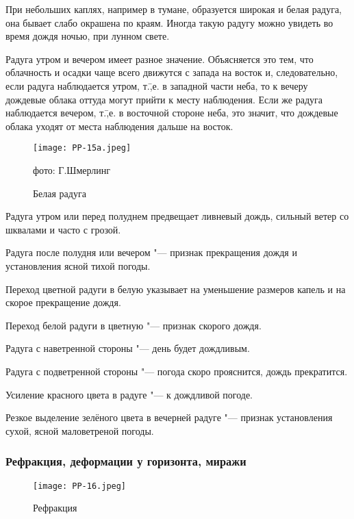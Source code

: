 При небольших каплях, например в тумане, образуется широкая и белая
радуга, она бывает слабо окрашена по краям. Иногда такую радугу можно
увидеть во время дождя ночью, при лунном свете.

Радуга утром и вечером имеет разное значение. Объясняется это тем, что
облачность и осадки чаще всего движутся с запада на восток и,
следовательно, если радуга наблюдается утром, т.\=,е. в западной части
неба, то к вечеру дождевые облака оттуда могут прийти к месту
наблюдения. Если же радуга наблюдается вечером, т.\=,е. в восточной
стороне неба, это значит, что дождевые облака уходят от места
наблюдения дальше на восток.

\begin{figure}[htb]
  \centering{}
  \texttt{[image: PP-15a.jpeg]}
  \caption{Белая радуга}
  \label{fig:pp15a}
  \small
  \centering{}фото: Г.Шмерлинг
\end{figure}

 Радуга утром или перед полуднем предвещает ливневый дождь,
сильный ветер со шквалами и часто с грозой.

 Радуга после полудня или вечером "--- признак прекращения дождя и
установления ясной тихой погоды.

 Переход цветной радуги в белую указывает на уменьшение
размеров капель и на скорое прекращение дождя.

 Переход белой радуги в цветную "--- признак скорого дождя.

 Радуга с наветренной стороны "--- день будет дождливым.

 Радуга с подветренной стороны "--- погода скоро прояснится, дождь прекратится.

 Усиление красного цвета в радуге "--- к дождливой погоде.

 Резкое выделение зелёного цвета в вечерней радуге "--- признак
установления сухой, ясной маловетреной погоды.

\subsubsection{Рефракция, деформации у горизонта, миражи}

\begin{figure}[htb]
  \centering{}
  \texttt{[image: PP-16.jpeg]}
  \caption{Рефракция}
  \label{fig:pp16}
  \small
  \centering{}
\end{figure}

